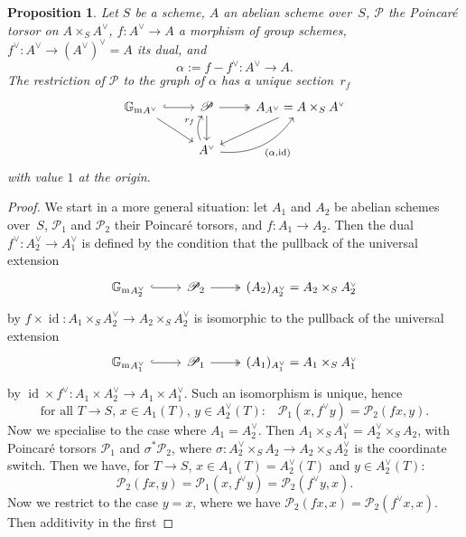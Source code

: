 \documentclass[11pt]{article}
\providecommand{\G}{}
\let\mathcal\mathscr
\let\oldvee\vee
\renewcommand{\vee}{{\scriptscriptstyle\oldvee}}
\theoremstyle{plain}
\newtheorem{Proposition}[subsection]{Proposition}
\theoremstyle{definition}
\numberwithin{equation}{subsection}
\renewcommand{\G}{\mathbb G}
\newcommand{\calP}{\mathcal{P}}
\newcommand{\Gm}{\G_{\mathrm{m}}}
\DeclareMathOperator{\id}{id}
\begin{document}
\begin{Proposition}\label{prop:ribsec}
Let $S$ be a scheme, $A$ an abelian scheme over~$S$, $\calP$ the
Poincaré torsor on $A\times_S A^\vee$, $f\colon A^\vee\to A$ a
morphism of group schemes, $f^\vee\colon A^\vee\to (A^\vee)^\vee=A$
its dual, and
\[
\alpha:=f-f^\vee\colon A^\vee\to A.
\]
The restriction of $\calP$ to the graph of $\alpha$ has a unique
section~$r_f$
\[
\begin{tikzcd}
{\Gm}_{A^\vee} \arrow[dr] \arrow[r, hook]
& \calP \arrow[r, two heads] \arrow[d]
& A_{A^\vee} = A\times_SA^\vee \arrow[dl]\\
& A^\vee \arrow[u, bend left, "r_f"]
\arrow[ur, bend right, "{(\alpha,\id)}"'] &
\end{tikzcd}
\]
with value $1$ at the origin.
\end{Proposition}
\begin{proof}
We start in a more general situation: let $A_1$ and $A_2$ be abelian
schemes over~$S$, $\calP_1$ and $\calP_2$ their Poincaré torsors,
and $f\colon\! A_1\!\to\!A_2$. Then the dual \hbox{$f^\vee\colon\! A_2^\vee\!\to\!A_1^\vee$} is defined by the condition that the pullback of the
universal extension
\[
\begin{tikzcd}
{\Gm}_{A_2^\vee} \arrow[r, hook]
& \calP_2 \arrow[r, two heads]
& (A_2)_{A_2^\vee} = A_2\times_SA_2^\vee
\end{tikzcd}
\]
by $f\times \id\colon A_1\times_S A_2^\vee\to A_2\times_S A_2^\vee$ is
isomorphic to the pullback of the universal extension
\[
\begin{tikzcd}
{\Gm}_{A_1^\vee} \arrow[r, hook]
& \calP_1 \arrow[r, two heads]
& (A_1)_{A_1^\vee} = A_1\times_SA_1^\vee
\end{tikzcd}
\]
by $\id\times f^\vee\colon A_1\times A_2^\vee\to A_1\times
A_1^\vee$. Such an isomorphism is unique, hence
\[
\text{for all $T\to S$, $x\in A_1(T)$, $y\in A_2^\vee(T)$:}
\quad \calP_1(x,f^\vee y) = \calP_2(fx,y).
\]
Now we specialise to the case where $A_1=A_2^\vee$. Then
$A_1\times_S A_1^\vee=A_2^\vee\times_S A_2$, with Poincaré torsors
$\calP_1$ and $\sigma^*\calP_2$, where $\sigma\colon
A_2^\vee\times_SA_2\to A_2\times_S A_2^\vee$ is the coordinate switch. Then
we have, for $T\to S$, $x\in A_1(T)=A_2^\vee(T)$ and $y\in A_2^\vee(T)$:
\begin{equation}\label{eq:isombiexts}
\calP_2(fx,y) = \calP_1(x,f^\vee y) = \calP_2(f^\vee y,x).
\end{equation}
Now we restrict to the case $y=x$, where we have
$\calP_2(fx,x)=\calP_2(f^\vee x,x)$. Then additivity in the first

\end{proof}
\end{document}

